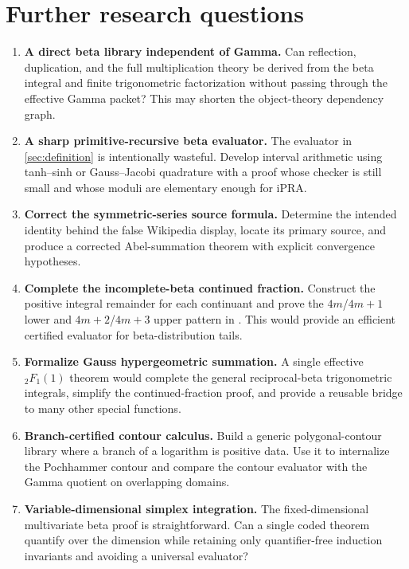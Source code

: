 \section{Further research questions}
\label{sec:further}

\begin{enumerate}
\item \textbf{A direct beta library independent of Gamma.}
Can reflection, duplication, and the full multiplication theory be derived from the beta integral and finite trigonometric factorization without passing through the effective Gamma packet?  This may shorten the object-theory dependency graph.

\item \textbf{A sharp primitive-recursive beta evaluator.}
The evaluator in \cref{sec:definition} is intentionally wasteful.  Develop interval arithmetic using tanh--sinh or Gauss--Jacobi quadrature with a proof whose checker is still small and whose moduli are elementary enough for iPRA.

\item \textbf{Correct the symmetric-series source formula.}
Determine the intended identity behind the false Wikipedia display, locate its primary source, and produce a corrected Abel-summation theorem with explicit convergence hypotheses.

\item \textbf{Complete the incomplete-beta continued fraction.}
Construct the positive integral remainder for each continuant and prove the $4m$/$4m+1$ lower and $4m+2$/$4m+3$ upper pattern in .  This would provide an efficient certified evaluator for beta-distribution tails.

\item \textbf{Formalize Gauss hypergeometric summation.}
A single effective ${}_2F_1(1)$ theorem would complete the general reciprocal-beta trigonometric integrals, simplify the continued-fraction proof, and provide a reusable bridge to many other special functions.

\item \textbf{Branch-certified contour calculus.}
Build a generic polygonal-contour library where a branch of a logarithm is positive data.  Use it to internalize the Pochhammer contour and compare the contour evaluator with the Gamma quotient on overlapping domains.

\item \textbf{Variable-dimensional simplex integration.}
The fixed-dimensional multivariate beta proof is straightforward.  Can a single coded theorem quantify over the dimension while retaining only quantifier-free induction invariants and avoiding a universal evaluator?


\end{enumerate}
